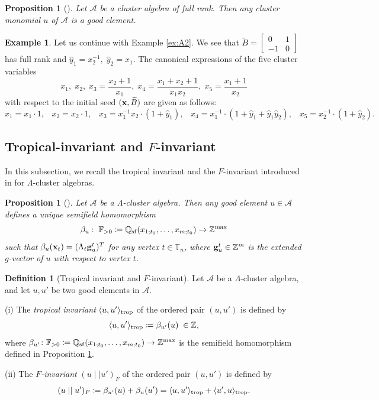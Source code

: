 \documentclass[12pt]{amsart}
\newtheorem{proposition}[theorem]{Proposition}
\theoremstyle{definition}
\newtheorem{definition}[theorem]{Definition}
\newtheorem{example}[theorem]{Example}
\theoremstyle{remark}
\numberwithin{equation}{section}
\begin{document}
\begin{proposition}[{\cite{GHKK18}}]
\label{pro:ghkk}
 Let $\mathcal A$ be a cluster algebra of full rank. Then any cluster monomial $u$ of $\mathcal A$ is a good element.
\end{proposition}


\begin{example}\label{ex:A2-2}
Let us continue with Example \ref{ex:A2}. We see that $\widetilde B=\begin{bmatrix}
    0&1\\-1&0
\end{bmatrix}$ has full rank and $\hat y_1=x_2^{-1},\;\hat y_2=x_1$. The canonical expressions of the five cluster variables
$$x_1, \;x_2, \;x_3=\frac{x_2+1}{x_1}, \;x_4=\frac{x_1+x_2+1}{x_1x_2}, \;x_5=\frac{x_1+1}{x_2}$$
with respect to the initial seed $({\bf x},\widetilde B)$ are given as follows:
    \[x_1=x_1\cdot 1,\;\;\;x_2=x_2\cdot 1,\;\;\;x_3={x_1^{-1}x_2\cdot(1+\widehat y_1),}\;\;\;  x_4={x_1^{-1}\cdot (1+\widehat y_1+\widehat y_1\widehat y_2),}\;\;\;
    x_5={x_2^{-1}\cdot (1+\widehat y_2)}.\]
\end{example}


\subsection{Tropical-invariant and $F$-invariant}
In this subsection, we recall the tropical invariant and the $F$-invariant introduced in \cite{Cao-2023} for $\mathsf{\Lambda}$-cluster algebras.

\begin{proposition}[{\cite[Proposition 4.4]{Cao-2023}}]
\label{pro:beta-map}
    Let  $\mathcal A$ be a $\mathsf{\Lambda}$-cluster algebra. Then any good element $u\in \mathcal A$ defines a unique semifield homomorphism 
  $$\beta_{u}:\; \mathbb F_{>0} \coloneqq   \mathbb Q_{\rm sf}(x_{1;t_0},\ldots,x_{m;t_0})\rightarrow \mathbb Z^{\rm max}$$ such that $\beta_{u}({\bf x}_t)=(\Lambda_t{\bf g}_u^t)^T$ for any vertex $t\in\mathbb T_n$, where ${\bf g}_u^t\in\mathbb Z^m$ is the extended $g$-vector of $u$ with respect to vertex $t$.
\end{proposition}



\begin{definition}[Tropical invariant and $F$-invariant] \label{def:f-invariant}
Let $\mathcal A$ be a $\mathsf{\Lambda}$-cluster algebra, and let $u,u'$ be two good elements in $\mathcal A$.

(i) The {\em tropical invariant} $\langle u,u'\rangle_{\rm trop}$ of the ordered pair $(u,u')$
 is  defined by 
 $$\langle u,u'\rangle_{\rm trop} \coloneqq   \beta_{u'}(u)\;\in \mathbb Z,$$ where
 $\beta_{u'}\colon\mathbb F_{>0} \coloneqq   \mathbb Q_{\rm sf}(x_{1;t_0},\ldots,x_{m;t_0})\rightarrow \mathbb Z^{\rm max}$ is the semifield homomorphism defined in Proposition \ref{pro:beta-map}.


(ii) The {\em $F$-invariant} $(u\mid\mid u')_F$ of the ordered pair $(u,u')$
 is defined by
 $$(u\mid\mid u')_F \coloneqq   \beta_{u'}(u)+\beta_u(u')=\langle u,u'\rangle_{\rm trop}+\langle u',u\rangle_{\rm trop}.$$
\end{definition}
\end{document}
